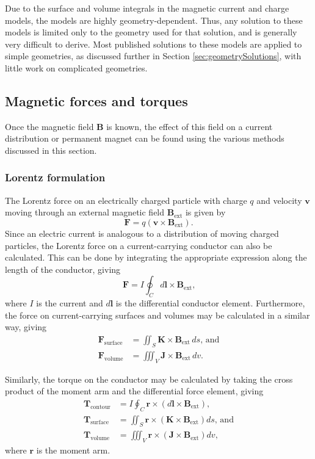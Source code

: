 Due to the surface and volume integrals in the magnetic current and charge models, the models are highly geometry-dependent. Thus, any solution to these models is limited only to the geometry used for that solution, and is generally very difficult to derive. Most published solutions to these models are applied to simple geometries, as discussed further in Section \ref{sec:geometrySolutions}, with little work on complicated geometries.

\subsection{Magnetic forces and torques}
Once the magnetic field \(\mathbf{B}\) is known, the effect of this field on a current distribution or permanent magnet can be found using the various methods discussed in this section.

\subsubsection{Lorentz formulation}
The Lorentz force on an electrically charged particle with charge \(q\) and velocity \(\mathbf{v}\) moving through an external magnetic field \(\mathbf{B}_\text{ext}\) is given by
\begin{equation}
    \mathbf{F} = q\left(\mathbf{v}\times\mathbf{B}_\text{ext}\right) \text{.}
\end{equation}
Since an electric current is analogous to a distribution of moving charged particles, the Lorentz force on a current-carrying conductor can also be calculated. This can be done by integrating the appropriate expression along the length of the conductor, giving
\begin{equation}
    \mathbf{F} = I \oint_C d\mathbf{l}\times\mathbf{B}_\text{ext} \text{,}
\end{equation}
where \(I\) is the current and \(d\mathbf{l}\) is the differential conductor element. Furthermore, the force on current-carrying surfaces and volumes may be calculated in a similar way, giving
\begin{align}
    \mathbf{F}_\text{surface} &= \iint_S \mathbf{K} \times \mathbf{B}_\text{ext}\, ds \text{, and} \\
    \mathbf{F}_\text{volume} &= \iiint_V \mathbf{J} \times \mathbf{B}_\text{ext}\, dv \text{.}
\end{align}

Similarly, the torque on the conductor may be calculated by taking the cross product of the moment arm and the differential force element, giving
\begin{align}
    \mathbf{T}_\text{contour} &= I \oint_C \mathbf{r} \times \left( d\mathbf{l} \times \mathbf{B}_\text{ext} \right) \text{,} \\
    \mathbf{T}_\text{surface} &= \iint_S \mathbf{r} \times \left( \mathbf{K} \times \mathbf{B}_\text{ext} \right) ds \text{, and} \\
    \mathbf{T}_\text{volume} &= \iiint_V \mathbf{r} \times \left( \mathbf{J} \times \mathbf{B}_\text{ext} \right) dv \text{,}
\end{align}
where \(\mathbf{r}\) is the moment arm.

